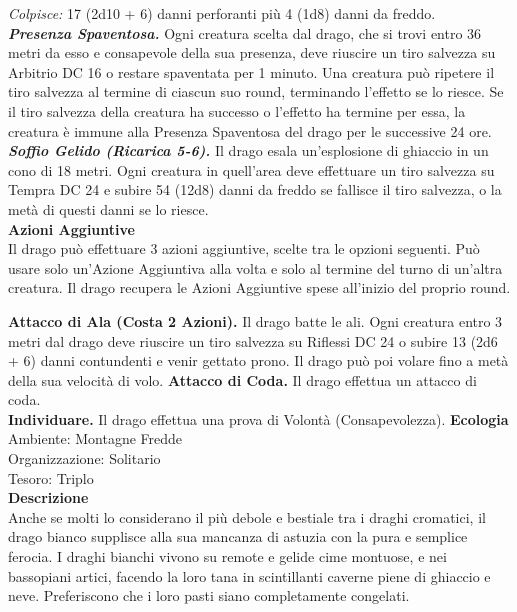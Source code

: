 \begin{multicols}{2}
\emph{Colpisce:} 17 (2d10 + 6) danni perforanti più 4 (1d8) danni da freddo.\\
\emph{\textbf{Presenza Spaventosa.}} Ogni creatura scelta dal drago, che si trovi entro 36 metri da esso e consapevole della sua presenza, deve riuscire un tiro salvezza su Arbitrio DC  16 o restare spaventata per 1 minuto. Una creatura può ripetere il tiro salvezza al termine di ciascun suo round, terminando l'effetto se lo riesce. Se il tiro salvezza della creatura ha successo o l'effetto ha termine per essa, la creatura è immune alla Presenza Spaventosa del drago per le successive 24 ore.\\
\emph{\textbf{Soffio Gelido (Ricarica 5-6).}} Il drago esala un'esplosione di ghiaccio in un cono di 18 metri. Ogni creatura in quell'area deve effettuare un tiro salvezza su Tempra DC  24 e subire 54 (12d8) danni da freddo se fallisce il tiro salvezza, o la metà di questi danni se lo riesce.\\
\textbf{Azioni Aggiuntive} \\
Il drago può effettuare 3 azioni aggiuntive, scelte tra le opzioni seguenti. Può usare solo un'Azione Aggiuntiva alla volta e solo al termine del turno di un'altra creatura. Il drago recupera le Azioni Aggiuntive spese all'inizio del proprio round.

\textbf{Attacco di Ala (Costa 2 Azioni).} Il drago batte le ali. Ogni creatura entro 3 metri dal drago deve riuscire un tiro salvezza su Riflessi DC  24 o subire 13 (2d6 + 6) danni contundenti e venir gettato prono. Il drago può poi volare fino a metà della sua velocità di volo. \textbf{Attacco di Coda.} Il drago effettua un attacco di coda. \\
\textbf{Individuare.} Il drago effettua una prova di Volontà (Consapevolezza).
\textbf{Ecologia}\\
Ambiente: Montagne Fredde\\
Organizzazione: Solitario\\
Tesoro: Triplo\\
\textbf{Descrizione}\\
Anche se molti lo considerano il più debole e bestiale tra i draghi cromatici, il drago bianco supplisce alla sua mancanza di astuzia con la pura e semplice ferocia. I draghi bianchi vivono su remote e gelide cime montuose, e nei bassopiani artici, facendo la loro tana in scintillanti caverne piene di ghiaccio e neve. Preferiscono che i loro pasti siano completamente congelati.\\



\end{multicols}
